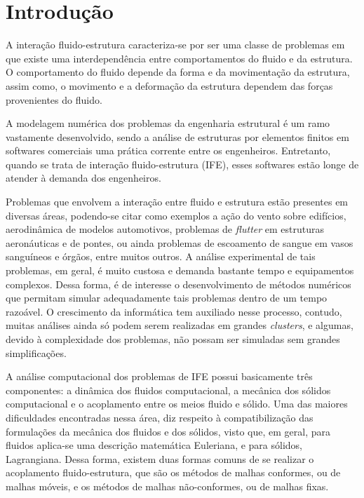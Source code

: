 \documentclass[tese_patricia.tex]{subfiles}
\begin{document}
\chapter[Introdução]{Introdução}\label{capitulo:introducao}

A interação fluido-estrutura caracteriza-se por ser uma classe de problemas em que existe uma interdependência entre comportamentos do fluido e da estrutura. O comportamento do fluido depende da forma e da movimentação da estrutura, assim como, o movimento e a deformação da estrutura dependem das forças provenientes do fluido.

A modelagem numérica dos problemas da engenharia estrutural é um ramo vastamente desenvolvido, sendo a análise de estruturas por elementos finitos em softwares comerciais uma prática corrente entre os engenheiros. Entretanto, quando se trata de interação fluido-estrutura (IFE), esses softwares estão longe de atender à demanda dos engenheiros.

Problemas que envolvem a interação entre fluido e estrutura estão presentes em diversas áreas, podendo-se citar como exemplos a ação do vento sobre edifícios, aerodinâmica de modelos automotivos, problemas de \textit{flutter} em estruturas aeronáuticas e de pontes, ou ainda problemas de escoamento de sangue em vasos sanguíneos e órgãos, entre muitos outros. A análise experimental de tais problemas, em geral, é muito custosa e demanda bastante tempo e equipamentos complexos. Dessa forma, é de interesse o desenvolvimento de métodos numéricos que permitam simular adequadamente tais problemas dentro de um tempo razoável. O crescimento da informática tem auxiliado nesse processo, contudo, muitas análises ainda só podem serem realizadas em grandes \textit{clusters}, e algumas, devido à complexidade dos problemas, não possam ser simuladas sem grandes simplificações.

A análise computacional dos problemas de IFE possui basicamente três componentes: a dinâmica dos fluidos computacional, a mecânica dos sólidos computacional e o acoplamento entre os meios fluido e sólido. Uma das maiores dificuldades encontradas nessa área, diz respeito à compatibilização das formulações da mecânica dos fluidos e dos sólidos, visto que, em geral, para fluidos aplica-se uma descrição matemática Euleriana, e para sólidos, Lagrangiana. Dessa forma, existem duas formas comuns de se realizar o acoplamento fluido-estrutura, que são os métodos de malhas conformes, ou de malhas móveis, e os métodos de malhas não-conformes, ou de malhas fixas. 
\end{document}

